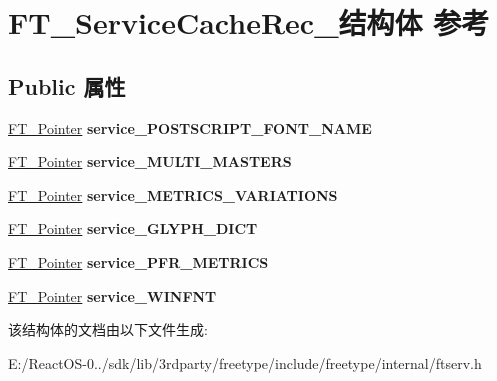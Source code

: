 \hypertarget{struct_f_t___service_cache_rec__}{}\section{F\+T\+\_\+\+Service\+Cache\+Rec\+\_\+结构体 参考}
\label{struct_f_t___service_cache_rec__}
\subsection*{Public 属性}
\begin{DoxyCompactItemize}
\item 
\mbox{\label{struct_f_t___service_cache_rec___a1b95ee574621c8b031fe239d449bfa5c}} 
\hyperlink{interfacevoid}{F\+T\+\_\+\+Pointer} {\bfseries service\+\_\+\+P\+O\+S\+T\+S\+C\+R\+I\+P\+T\+\_\+\+F\+O\+N\+T\+\_\+\+N\+A\+ME}
\item 
\mbox{\label{struct_f_t___service_cache_rec___abf51ac75b59eeac29ad5e4bbbc50e749}} 
\hyperlink{interfacevoid}{F\+T\+\_\+\+Pointer} {\bfseries service\+\_\+\+M\+U\+L\+T\+I\+\_\+\+M\+A\+S\+T\+E\+RS}
\item 
\mbox{\label{struct_f_t___service_cache_rec___a6819159a0a0a7e254f80ba0a8a61f32c}} 
\hyperlink{interfacevoid}{F\+T\+\_\+\+Pointer} {\bfseries service\+\_\+\+M\+E\+T\+R\+I\+C\+S\+\_\+\+V\+A\+R\+I\+A\+T\+I\+O\+NS}
\item 
\mbox{\label{struct_f_t___service_cache_rec___af8bbf442f497ad21666069ec33aaa88a}} 
\hyperlink{interfacevoid}{F\+T\+\_\+\+Pointer} {\bfseries service\+\_\+\+G\+L\+Y\+P\+H\+\_\+\+D\+I\+CT}
\item 
\mbox{\label{struct_f_t___service_cache_rec___ac5d029d7f442e8b727c40d5a88faa344}} 
\hyperlink{interfacevoid}{F\+T\+\_\+\+Pointer} {\bfseries service\+\_\+\+P\+F\+R\+\_\+\+M\+E\+T\+R\+I\+CS}
\item 
\mbox{\label{struct_f_t___service_cache_rec___abb824452cfb20932fbd22405323781f9}} 
\hyperlink{interfacevoid}{F\+T\+\_\+\+Pointer} {\bfseries service\+\_\+\+W\+I\+N\+F\+NT}
\end{DoxyCompactItemize}


该结构体的文档由以下文件生成\+:\begin{DoxyCompactItemize}
\item 
E\+:/\+React\+O\+S-\/0../sdk/lib/3rdparty/freetype/include/freetype/internal/ftserv.\+h\end{DoxyCompactItemize}
